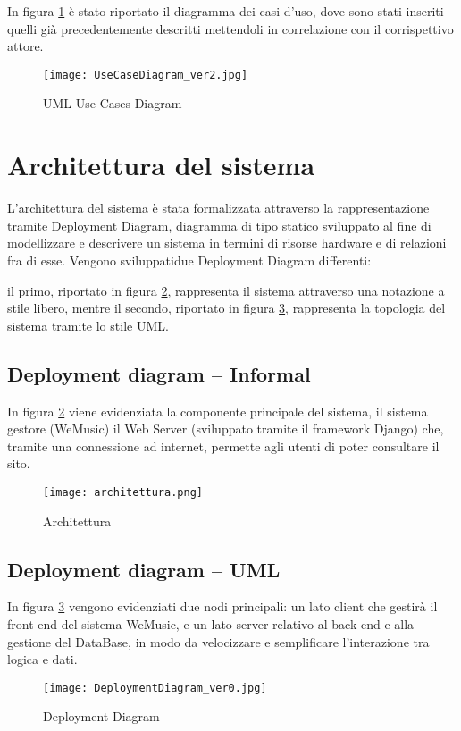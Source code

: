In figura \ref{fig-uml-use-cases} è stato riportato il diagramma dei casi d'uso, dove sono stati inseriti quelli
già precedentemente descritti mettendoli in correlazione con il corrispettivo attore.

\begin{figure}[H]
      \centering
      \texttt{[image: UseCaseDiagram\_ver2.jpg]}
      \caption{UML Use Cases Diagram}
      \label{fig-uml-use-cases}
\end{figure}


\newpage
\section{Architettura del sistema}
L'architettura del sistema è stata formalizzata attraverso la rappresentazione tramite Deployment Diagram, diagramma di tipo statico 
sviluppato al fine di modellizzare e descrivere un sistema in termini di risorse hardware e di relazioni fra di esse.
Vengono sviluppatidue Deployment Diagram differenti:

il primo, riportato in figura \ref{architettura}, rappresenta il sistema
attraverso una notazione a stile libero, mentre il secondo, riportato in figura \ref{dep_diagram}, rappresenta
la topologia del sistema tramite lo stile UML. 

\vspace{2cm}

\subsection{Deployment diagram -- Informal}
In figura \ref{architettura} viene evidenziata la componente principale del sistema, il sistema gestore (WeMusic)
il Web Server (sviluppato tramite il framework Django) che, tramite una connessione ad internet, permette 
agli utenti di poter consultare il sito.
\begin{figure}[H]
      \centering
      \texttt{[image: architettura.png]}
      \caption{Architettura}
      \label{architettura}
\end{figure}


\newpage
\subsection{Deployment diagram -- UML}
In figura \ref{dep_diagram} vengono evidenziati due nodi principali: 
un lato client che gestirà il front-end del sistema WeMusic, e un lato server relativo 
al back-end e alla gestione del DataBase, in modo da velocizzare e semplificare l'interazione tra logica e dati. 
\begin{figure}[H]
    \centering
    \texttt{[image: DeploymentDiagram\_ver0.jpg]}
    \caption{Deployment Diagram}
    \label{dep_diagram}
\end{figure}



